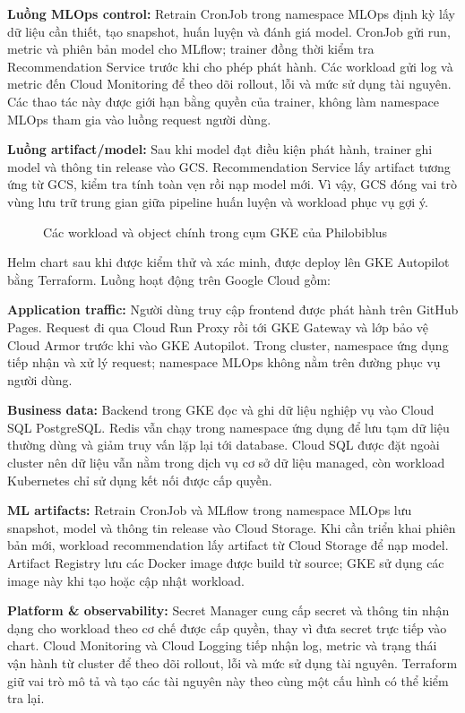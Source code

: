 \textbf{Luồng MLOps control:} Retrain CronJob trong namespace MLOps định kỳ lấy dữ liệu cần thiết, tạo snapshot, huấn luyện và đánh giá model. CronJob gửi run, metric và phiên bản model cho MLflow; trainer đồng thời kiểm tra Recommendation Service trước khi cho phép phát hành. Các workload gửi log và metric đến Cloud Monitoring để theo dõi rollout, lỗi và mức sử dụng tài nguyên. Các thao tác này được giới hạn bằng quyền của trainer, không làm namespace MLOps tham gia vào luồng request người dùng.

\textbf{Luồng artifact/model:} Sau khi model đạt điều kiện phát hành, trainer ghi model và thông tin release vào GCS. Recommendation Service lấy artifact tương ứng từ GCS, kiểm tra tính toàn vẹn rồi nạp model mới. Vì vậy, GCS đóng vai trò vùng lưu trữ trung gian giữa pipeline huấn luyện và workload phục vụ gợi ý.

\begin{figure}[H]
\centering

\caption{Các workload và object chính trong cụm GKE của Philobiblus}
\label{fig:kubernetes-architecture}
\end{figure}

Helm chart sau khi được kiểm thử và xác minh, được deploy lên GKE Autopilot bằng Terraform. Luồng hoạt động trên Google Cloud gồm:

\textbf{Application traffic:} Người dùng truy cập frontend được phát hành trên GitHub Pages. Request đi qua Cloud Run Proxy rồi tới GKE Gateway và lớp bảo vệ Cloud Armor trước khi vào GKE Autopilot. Trong cluster, namespace ứng dụng tiếp nhận và xử lý request; namespace MLOps không nằm trên đường phục vụ người dùng.

\textbf{Business data:} Backend trong GKE đọc và ghi dữ liệu nghiệp vụ vào Cloud SQL PostgreSQL. Redis vẫn chạy trong namespace ứng dụng để lưu tạm dữ liệu thường dùng và giảm truy vấn lặp lại tới database. Cloud SQL được đặt ngoài cluster nên dữ liệu vẫn nằm trong dịch vụ cơ sở dữ liệu managed, còn workload Kubernetes chỉ sử dụng kết nối được cấp quyền.

\textbf{ML artifacts:} Retrain CronJob và MLflow trong namespace MLOps lưu snapshot, model và thông tin release vào Cloud Storage. Khi cần triển khai phiên bản mới, workload recommendation lấy artifact từ Cloud Storage để nạp model. Artifact Registry lưu các Docker image được build từ source; GKE sử dụng các image này khi tạo hoặc cập nhật workload.

\textbf{Platform \& observability:} Secret Manager cung cấp secret và thông tin nhận dạng cho workload theo cơ chế được cấp quyền, thay vì đưa secret trực tiếp vào chart. Cloud Monitoring và Cloud Logging tiếp nhận log, metric và trạng thái vận hành từ cluster để theo dõi rollout, lỗi và mức sử dụng tài nguyên. Terraform giữ vai trò mô tả và tạo các tài nguyên này theo cùng một cấu hình có thể kiểm tra lại.

